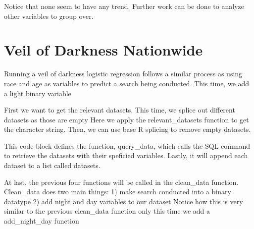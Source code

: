 \documentclass[
]{book}
\begin{document}
Notice that none seem to have any trend. Further work can be done to analyze other variables to group over.

\hypertarget{veil-of-darkness-nationwide}{%
\section{Veil of Darkness Nationwide}\label{veil-of-darkness-nationwide}}

Running a veil of darkness logistic regression follows a similar process as using race and age as variables to predict a search being conducted. This time, we add a light binary variable

First we want to get the relevant datasets. This time, we splice out different datasets as those are empty
Here we apply the relevant\_datasets function to get the character string. Then, we can use base R splicing to remove empty datasets.

This code block defines the function, query\_data, which calls the SQL command to retrieve the datasets with their speficied variables. Lastly, it will append each dataset to a list called datasets.

At last, the previous four functions will be called in the clean\_data function. Clean\_data does two main things:
1) make search conducted into a binary datatype
2) add night and day variables to our dataset
Notice how this is very similar to the previous clean\_data function only this time we add a add\_night\_day function
\end{document}
